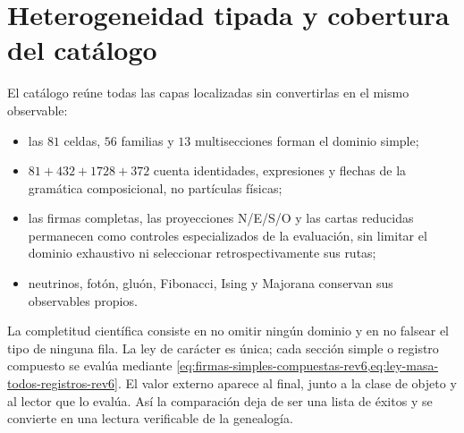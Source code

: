 \section{Heterogeneidad tipada y cobertura del catálogo}

El catálogo reúne todas las capas localizadas sin convertirlas en el mismo
observable:
\begin{itemize}
\item las \(81\) celdas, \(56\) familias y \(13\) multisecciones forman el
dominio simple;
\item \(81+432+1728+372\) cuenta identidades, expresiones y flechas de la
gramática composicional, no partículas físicas;
\item las firmas completas, las proyecciones N/E/S/O y las cartas reducidas
      permanecen como controles especializados de la evaluación, sin limitar
      el dominio exhaustivo ni seleccionar retrospectivamente sus rutas;
\item neutrinos, fotón, gluón, Fibonacci, Ising y Majorana conservan sus
observables propios.
\end{itemize}

La completitud científica consiste en no omitir ningún dominio y en no
falsear el tipo de ninguna fila. La ley de carácter es única; cada sección
simple o registro compuesto se evalúa mediante
\cref{eq:firmas-simples-compuestas-rev6,eq:ley-masa-todos-registros-rev6}.
El valor externo aparece al final, junto a la clase de objeto y al lector que
lo evalúa. Así la comparación deja de ser una lista de éxitos y se convierte
en una lectura verificable de la genealogía.
